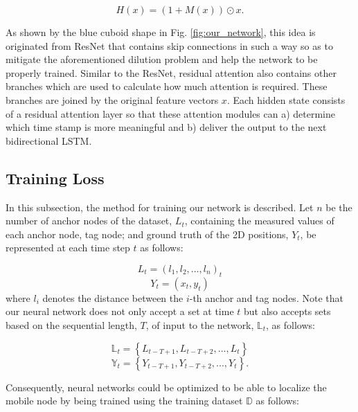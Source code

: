 \documentclass[letterpaper, 10 pt, conference]{ieeeconf}
\begin{document}
\begin{equation}
H(x)=\left(1+M(x)\right)\odot x.
\end{equation} 

As shown by the blue cuboid shape in Fig. \ref{fig:our_network}, this idea is originated from ResNet \cite{he2016deep} that contains skip connections in such a way so as to mitigate the aforementioned dilution problem and help the network to be properly trained. Similar to the ResNet, residual attention also contains other branches which are used to calculate how much attention is required. These branches are joined by the original feature vectors $x$. Each hidden state consists of a residual attention layer so that these attention modules can a) determine which time stamp is more meaningful   and b) deliver the output to the next bidirectional LSTM.

\subsection{Training Loss}

In this subsection, the method for training our network is described. Let $n$ be the number of anchor nodes of the dataset, $L_{t}$, containing the measured values of each anchor node, tag node; and ground truth of the 2D positions, $Y_t$, be represented at each time step $t$ as follows: 

\begin{equation}
L_{t} = (l_{1}, l_{2}, ..., l_{n})_{t}
\end{equation}
\begin{equation}
Y_t = (x_t, y_t)
\end{equation}
where $l_{i}$ denotes the distance between the $i$-th anchor and tag nodes. Note that our neural network does not only accept a set at time $t$ but also accepts sets based on the sequential length, $T$, of input to the network, $\mathbb{L}_t$, as follows:

\begin{equation}
\mathbb{L}_t = \left\{L_{t-T+1}, L_{t-T+2}, ..., L_t\right\} 
\end{equation}
\begin{equation}
\mathbb{Y}_t = \left\{Y_{t-T+1}, Y_{t-T+2}, ..., Y_t\right\}.
\end{equation}

Consequently, neural networks could be optimized to be able to localize the mobile node by being trained using the training dataset $\mathbb{D}$ as follows:  
\end{document}
